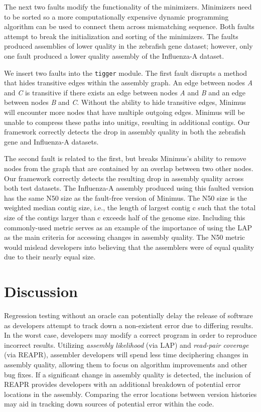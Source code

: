 The next two faults modify the functionality of the minimizers.
Minimizers need to be sorted so a more computationally expensive dynamic programming algorithm can be used to connect them across mismatching sequence.
Both faults attempt to break the initialization and sorting of the minimizers.
The faults produced assemblies of lower quality in the zebrafish gene dataset; however, only one fault produced a lower quality assembly of the Influenza-A dataset.

We insert two faults into the \texttt{tigger} module.
The first fault disrupts a method that hides transitive edges within the assembly graph.
An edge between nodes \emph{A} and \emph{C} is transitive if there exists an edge between nodes \emph{A} and \emph{B} and an edge between nodes \emph{B} and \emph{C}.
Without the ability to hide transitive edges, Minimus will encounter more nodes that have multiple outgoing edges.
Minimus will be unable to compress these paths into unitigs, resulting in additional contigs.
Our framework correctly detects the drop in assembly quality in both the zebrafish gene and Influenza-A datasets.

The second fault is related to the first, but breaks Minimus's ability to remove nodes from the graph that are contained by an overlap between two other nodes.
Our framework correctly detects the resulting drop in assembly quality across both test datasets.
The Influenza-A assembly produced using this faulted version has the same N50 size as the fault-free version of Minimus.
The N50 size is the weighted median
contig size, i.e., the length of largest contig c such that
the total size of the contigs larger than c exceeds half of
the genome size.
Including this commonly-used metric serves as an example of the importance of using the LAP as the main criteria for accessing changes in assembly quality.
The N50 metric would mislead developers into believing that the assemblers were of equal quality due to their nearly equal size.


\section{Discussion}
\label{discussion}

Regression testing without an oracle can potentially delay the release of software as developers attempt to track down a non-existent error due to differing results.
In the worst case, developers may modify a correct program in order to reproduce incorrect results.
Utilizing \emph{assembly likelihood} (via LAP) and \emph{read-pair coverage} (via REAPR), assembler developers will spend less time deciphering changes in assembly quality, allowing them to focus on algorithm improvements and other bug fixes.
If a significant change in assembly quality is detected, the inclusion of REAPR provides developers with an additional breakdown of potential error locations in the assembly.
Comparing the error locations between version histories may aid in tracking down sources of potential error within the code.

